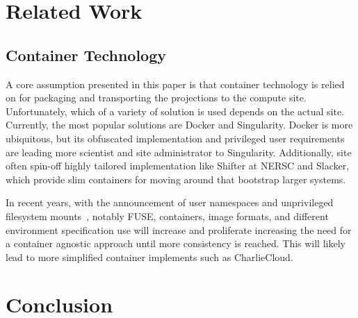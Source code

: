 \documentclass[sigconf]{acmart}
\begin{document}
\section{Related Work}
\subsection{Container Technology}
A core assumption presented in this paper is that 
container technology is relied on for packaging and
transporting the projections to the compute site.
Unfortunately, which of a variety of solution is used 
depends on the actual site.
Currently, the most popular solutions are
Docker\cite{Merkel:2014:DLL:2600239.2600241} and
Singularity\cite{Singularity}.
Docker is more ubiquitous, but its 
obfuscated implementation and privileged user requirements 
are leading more scientist and site administrator
to Singularity.
Additionally, site often spin-off highly tailored implementation
like Shifter\cite{Jacobsen2015ContainT} at NERSC
and Slacker\cite{194430}, which provide slim containers
for moving around that bootstrap larger systems.

In recent years, with the announcement of user namespaces
and unprivileged filesystem mounts~\cite{user-filesys-mount}, notably FUSE, 
containers, image formats, and different environment specification
use will increase and proliferate increasing the need for a container
agnostic approach until more consistency is reached.
This will likely lead to more simplified container implements such as
CharlieCloud\cite{Priedhorsky:2017:CUC:3126908.3126925}.


\section{Conclusion}
\end{document}
